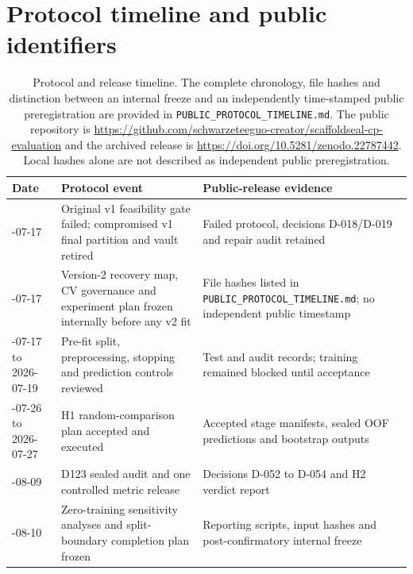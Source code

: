 \documentclass[10pt]{article}
\begin{document}
\section*{Protocol timeline and public identifiers}


\begin{table}[htbp]
\centering
\caption{Protocol and release timeline. The complete chronology, file hashes and distinction between an internal freeze and an independently time-stamped public preregistration are provided in \texttt{PUBLIC\_\allowbreak{}PROTOCOL\_\allowbreak{}TIMELINE.md}. The public repository is \url{https://github.com/schwarzeteeguo-creator/scaffoldseal-cp-evaluation} and the archived release is \url{https://doi.org/10.5281/zenodo.22787442}. Local hashes alone are not described as independent public preregistration.}
\scriptsize
\setlength{\tabcolsep}{3pt}
\renewcommand{\arraystretch}{1.15}
\begin{tabularx}{\textwidth}{>{\raggedright\arraybackslash}p{}>{\raggedright\arraybackslash}X>{\raggedright\arraybackslash}p{}}
\toprule
\textbf{Date} & \textbf{Protocol event} & \textbf{Public-release evidence} \\
\midrule
2026-07-17 & Original v1 feasibility gate failed; compromised v1 final partition and vault retired & Failed protocol, decisions D-018/D-019 and repair audit retained \\
2026-07-17 & Version-2 recovery map, CV governance and experiment plan frozen internally before any v2 fit & File hashes listed in \texttt{PUBLIC\_\allowbreak{}PROTOCOL\_\allowbreak{}TIMELINE.md}; no independent public timestamp \\
2026-07-17 to 2026-07-19 & Pre-fit split, preprocessing, stopping and prediction controls reviewed & Test and audit records; training remained blocked until acceptance \\
2026-07-26 to 2026-07-27 & H1 random-comparison plan accepted and executed & Accepted stage manifests, sealed OOF predictions and bootstrap outputs \\
2026-08-09 & D123 sealed audit and one controlled metric release & Decisions D-052 to D-054 and H2 verdict report \\
2026-08-10 & Zero-training sensitivity analyses and split-boundary completion plan frozen & Reporting scripts, input hashes and post-confirmatory internal freeze \\
\bottomrule
\end{tabularx}
\end{table}
\end{document}
